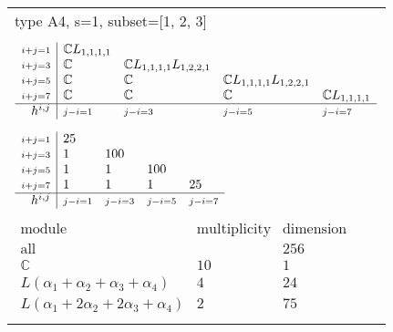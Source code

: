 \documentclass[crop,border=2mm]{standalone}
\begin{document}
\begin{tabular}{l}
{\huge type A4, s=1, subset=[1, 2, 3]}\\ \\


$\displaystyle
\begin{array}{r|l l l l}
	{\scriptstyle i+j=1}&\mathbb{C}L_{1,1,1,1}&&&\\
	{\scriptstyle i+j=3}&\mathbb{C}&\mathbb{C}L_{1,1,1,1}L_{1,2,2,1}&&\\
	{\scriptstyle i+j=5}&\mathbb{C}&\mathbb{C}&\mathbb{C}L_{1,1,1,1}L_{1,2,2,1}&\\
	{\scriptstyle i+j=7}&\mathbb{C}&\mathbb{C}&\mathbb{C}&\mathbb{C}L_{1,1,1,1}\\
	\hline h^{i,j}&{\scriptstyle j-i=1}&{\scriptstyle j-i=3}&{\scriptstyle j-i=5}&{\scriptstyle j-i=7}
\end{array}
$ \\ \\


$\displaystyle
\begin{array}{r|l l l l}
	{\scriptstyle i+j=1}&25&&&\\
	{\scriptstyle i+j=3}&1&100&&\\
	{\scriptstyle i+j=5}&1&1&100&\\
	{\scriptstyle i+j=7}&1&1&1&25\\
	\hline h^{i,j}&{\scriptstyle j-i=1}&{\scriptstyle j-i=3}&{\scriptstyle j-i=5}&{\scriptstyle j-i=7}
\end{array}
$ \\ \\


$\displaystyle
\begin{array}{rll}
	\text{module}&\text{multiplicity}&\text{dimension} \\ \hline \text{all}&&256 \\
	\mathbb{C}&10&1\\
	L\left(\alpha_{1}+\alpha_{2}+\alpha_{3}+\alpha_{4}\right)&4&24\\
	L\left(\alpha_{1}+ 2\alpha_{2}+ 2\alpha_{3}+\alpha_{4}\right)&2&75
\end{array}
$ \\ \\

\end{tabular}
\end{document}
